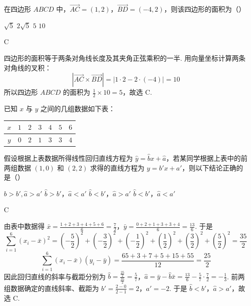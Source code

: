 \begin{problem}
在四边形 \(ABCD\) 中，\(\overrightarrow{AC} = (1, 2)\)，\(\overrightarrow{BD} = (-4, 2)\)，则该四边形的面积为（\quad）

\choices
    {\(\sqrt{5}\)}
    {\(2\sqrt{5}\)}
    {\(5\)}
    {\(10\)}
\begin{answer}
C
\end{answer}

\begin{solution}
四边形的面积等于两条对角线长度及其夹角正弦乘积的一半. 用向量坐标计算两条对角线的叉积：
\[
\left|\overrightarrow{AC}\times\overrightarrow{BD}\right|
=\left|1\cdot2-2\cdot(-4)\right|=10
\]
所以四边形 \(ABCD\) 的面积为 \(\frac12\times10=5\)，故选 C.
\end{solution}
\end{problem}

\begin{problem}
已知 \(x\) 与 \(y\) 之间的几组数据如下表：

\begin{center}
\begin{tabular}{c|cccccc}
\(x\) & \(1\) & \(2\) & \(3\) & \(4\) & \(5\) & \(6\) \\
\hline
\(y\) & \(0\) & \(2\) & \(1\) & \(3\) & \(3\) & \(4\)
\end{tabular}
\end{center}

假设根据上表数据所得线性回归直线方程为 \( \hat{y} = \hat{b}x + \hat{a} \)，若某同学根据上表中的前两组数据 \((1, 0)\) 和 \((2, 2)\) 求得的直线方程为 \( y = b'x + a' \)，则以下结论正确的是（\quad）

\choices
    {\(\hat{b} > b', \hat{a} > a'\)}
    {\(\hat{b} > b'\)，\(\hat{a} < a'\)}
    {\(\hat{b} < b'\)，\(\hat{a} > a'\)}
    {\(\hat{b} < b'\)，\(\hat{a} < a'\)}
\begin{answer}
C
\end{answer}

\begin{solution}
由表中数据得 \(\bar{x}=\frac{1+2+3+4+5+6}{6}=\frac72\)，\(\bar{y}=\frac{0+2+1+3+3+4}{6}=\frac{13}{6}\). 于是
\[
\sum_{i=1}^{6}(x_i-\bar{x})^2
=\left(-\frac52\right)^2+\left(-\frac32\right)^2+\left(-\frac12\right)^2+\left(\frac12\right)^2+\left(\frac32\right)^2+\left(\frac52\right)^2=\frac{35}{2}
\]
\[
\sum_{i=1}^{6}(x_i-\bar{x})(y_i-\bar{y})
=\frac{65+3+7+5+15+55}{12}=\frac{25}{2}
\]
因此回归直线的斜率与截距分别为
\(\hat b=\frac{\frac{25}{2}}{\frac{35}{2}}=\frac57\)，\(\hat a=\bar y-\hat b\bar x=\frac{13}{6}-\frac57\cdot\frac72=-\frac13\).
前两组数据确定的直线斜率、截距为 \(b'=\frac{2-0}{2-1}=2\)，\(a'=-2\). 于是 \(\hat b<b'\)，\(\hat a>a'\)，故选 C.
\end{solution}
\end{problem}

